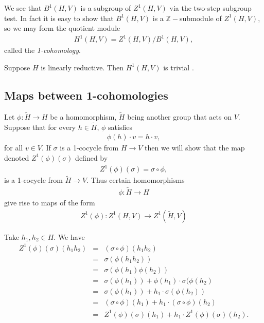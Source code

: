 We see that $B^1(H, V)$ is a subgroup of $Z^1(H, V)$ via the two-step subgroup test. In fact it is easy to show that $B^1(H, V)$ is a $\mathbb{Z}-$submodule of $Z^1(H, V)$, so we may form the quotient module
\begin{eqnarray*}
	H^1\left(H, V\right) = Z^1\left(H, V\right) / B^1\left(H, V\right),
\end{eqnarray*}
called the \emph{1-cohomology}.
\begin{lemma} Suppose $H$ is linearly reductive. Then $H^1(H, V)$ is trivial \cite{hochschild1965structure}.
\end{lemma}

\subsection{Maps between 1-cohomologies}
Let $\phi:\tilde{H}\rightarrow H$ be a homomorphism, $\tilde{H}$ being another group that acts on $V$. Suppose that for every $h \in \tilde{H}$, $\phi$ satisfies
\begin{eqnarray*}
	\phi(h)\cdot v = h\cdot v,
\end{eqnarray*}
for all $v \in V$. If $\sigma$ is a 1-cocycle from $H\rightarrow V$ then we will show that the map denoted $Z^1(\phi)(\sigma)$ defined by
\begin{eqnarray*}
	Z^1(\phi)(\sigma) = \sigma \circ \phi,
\end{eqnarray*}
is a 1-cocycle from $\tilde{H}\rightarrow V$. Thus certain homomorphisms
\begin{eqnarray*}
	\phi:\tilde{H} \rightarrow H
\end{eqnarray*}
give rise to maps of the form
\begin{eqnarray*}
	Z^1(\phi):Z^1(H, V)\rightarrow Z^1(\tilde{H}, V)
\end{eqnarray*}


Take $h_1, h_2 \in H$. We have
\begin{eqnarray*}
	Z^1(\phi)(\sigma)(h_1h_2) &=& (\sigma \circ \phi)(h_1h_2) \\
		&=& \sigma(\phi(h_1h_2)) \\
		&=& \sigma(\phi(h_1)\phi(h_2)) \\
		&=& \sigma(\phi(h_1)) + \phi(h_1)\cdot\sigma(\phi(h_2) \\
		&=& \sigma(\phi(h_1)) + h_1\cdot\sigma(\phi(h_2)) \\
		&=& (\sigma \circ \phi)(h_1) + h_1 \cdot (\sigma \circ \phi)(h_2) \\
		&=& Z^1(\phi)(\sigma)(h_1) + h_1\cdot Z^1(\phi)(\sigma)(h_2).
\end{eqnarray*}

